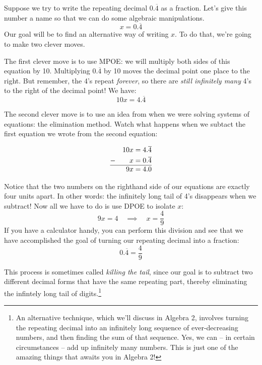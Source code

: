 Suppose we try to write the repeating decimal $0.\overline{4}$ as a fraction. Let's give this number a name so that we can do some algebraic manipulations. \[x = 0.\overline{4}\] Our goal will be to find an alternative way of writing $x$. To do that, we're going to make two clever moves.

The first clever move is to use MPOE: we will multiply both sides of this equation by 10. Multiplying $0.\overline{4}$ by 10 moves the decimal point one place to the right. But remember, the 4's repeat \textit{forever}, so there are \textit{still infinitely many} 4's to the right of the decimal point! We have: \[10x = 4.\overline{4}\]

The second clever move is to use an idea from when we were solving systems of equations: the elimination method. Watch what happens when we subtact the first equation we wrote from the second equation:

\[\begin{aligned}
	&&	10x &= 4.\overline{4}\\
- 	&& 	x 	&= 0.\overline{4}\\\hline
	&&	9x 	&= 4.0
\end{aligned}\]

Notice that the two numbers on the righthand side of our equations are exactly four units apart. In other words: the infinitely long tail of 4's disappears when we subtract! Now all we have to do is use DPOE to isolate $x$: \[9x = 4 \quad\implies\quad x = \frac{4}{9}\] If you have a calculator handy, you can perform this division and see that we have accomplished the goal of turning our repeating decimal into a fraction:\[0.\overline{4} = \frac{4}{9}\]

This process is sometimes called \textit{killing the tail}, since our goal is to subtract two different decimal forms that have the same repeating part, thereby eliminating the infintely long tail of digits.\footnote{An alternative technique, which we'll discuss in Algebra 2, involves turning the repeating decimal into an infinitely long sequence of ever-decreasing numbers, and then finding the sum of that sequence. Yes, we can -- in certain circumstances -- add up infinitely many numbers. This is just one of the amazing things that awaits you in Algebra 2!}

